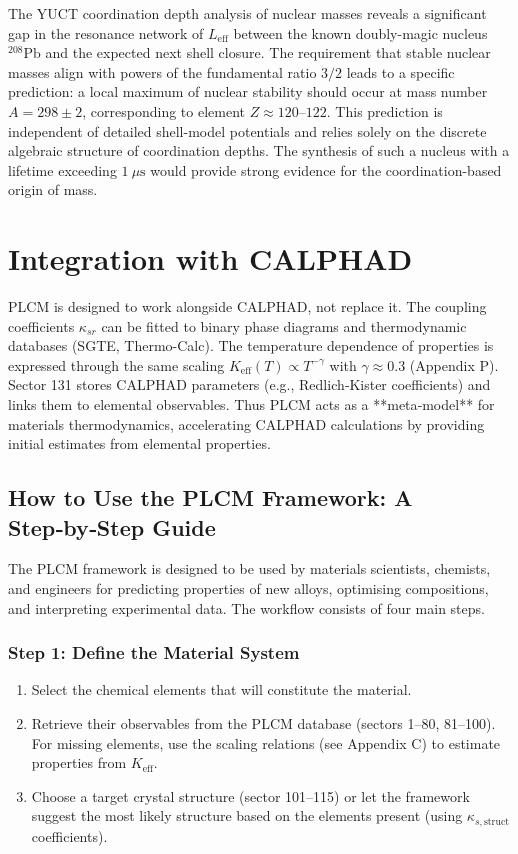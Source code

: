 \documentclass[12pt,a4paper]{article}
\newcommand{\Keff}{K_{\mathrm{eff}}}
\begin{document}
The YUCT coordination depth analysis of nuclear masses reveals a significant gap in the resonance network of $L_{\mathrm{eff}}$ between the known doubly-magic nucleus $^{208}\mathrm{Pb}$ and the expected next shell closure. The requirement that stable nuclear masses align with powers of the fundamental ratio $3/2$ leads to a specific prediction: a local maximum of nuclear stability should occur at mass number $A = 298 \pm 2$, corresponding to element $Z \approx 120$--$122$. This prediction is independent of detailed shell-model potentials and relies solely on the discrete algebraic structure of coordination depths. The synthesis of such a nucleus with a lifetime exceeding $1\ \mu\text{s}$ would provide strong evidence for the coordination-based origin of mass.

	\section{Integration with CALPHAD}
	
	PLCM is designed to work alongside CALPHAD, not replace it. The coupling coefficients \(\kappa_{sr}\) can be fitted to binary phase diagrams and thermodynamic databases (SGTE, Thermo-Calc). The temperature dependence of properties is expressed through the same scaling \(\Keff(T) \propto T^{-\gamma}\) with \(\gamma \approx 0.3\) (Appendix P). Sector 131 stores CALPHAD parameters (e.g., Redlich‑Kister coefficients) and links them to elemental observables. Thus PLCM acts as a **meta‑model** for materials thermodynamics, accelerating CALPHAD calculations by providing initial estimates from elemental properties.
	
	\subsection{How to Use the PLCM Framework: A Step‑by‑Step Guide}
	
	The PLCM framework is designed to be used by materials scientists, chemists, and engineers for predicting properties of new alloys, optimising compositions, and interpreting experimental data. The workflow consists of four main steps.
	
	\subsubsection{Step 1: Define the Material System}
	
	\begin{enumerate}
		\item Select the chemical elements that will constitute the material.
		\item Retrieve their observables from the PLCM database (sectors 1–80, 81–100). For missing elements, use the scaling relations (see Appendix C) to estimate properties from \(\Keff\).
		\item Choose a target crystal structure (sector 101–115) or let the framework suggest the most likely structure based on the elements present (using \(\kappa_{s,\text{struct}}\) coefficients).
	\end{enumerate}
	
\end{document}
